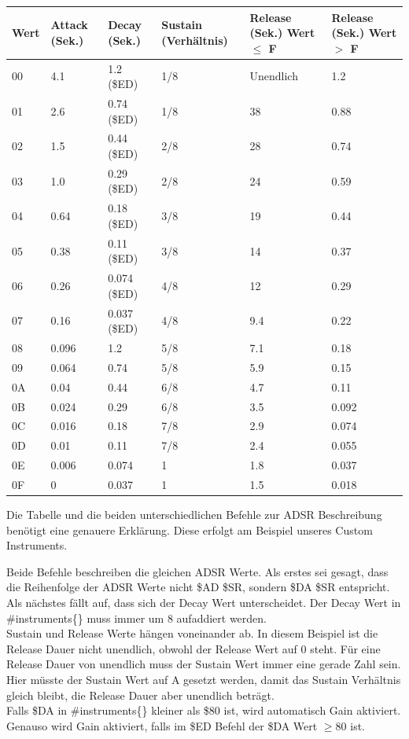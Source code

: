\begin{tabularx}{\textwidth}{|l|X|X|X|X|X|}
	\hline
	Wert & Attack (Sek.) & Decay (Sek.)  & Sustain (Verhältnis) & Release (Sek.) Wert $\leq$ F & Release (Sek.) Wert $>$ F \\
	\hline
	00 & 4.1 & 1.2 (\$ED) & 1/8 & Unendlich & 1.2\\
	\hline
	01 & 2.6 & 0.74 (\$ED) & 1/8 & 38 & 0.88 \\
	\hline
	02 & 1.5 & 0.44 (\$ED) & 2/8 & 28 & 0.74 \\
	\hline
	03 & 1.0 & 0.29 (\$ED) & 2/8 & 24 & 0.59 \\
	\hline
	04 & 0.64 & 0.18 (\$ED) & 3/8 & 19 & 0.44 \\
	\hline
	05 & 0.38 & 0.11 (\$ED) & 3/8 & 14 & 0.37 \\
	\hline
	06 & 0.26 & 0.074 (\$ED) & 4/8 & 12 & 0.29 \\
	\hline
	07 & 0.16 & 0.037 (\$ED) & 4/8 & 9.4 & 0.22 \\
	\hline
	08 & 0.096 & 1.2 & 5/8 & 7.1 & 0.18 \\
	\hline
	09 & 0.064 & 0.74 & 5/8 & 5.9 & 0.15 \\
	\hline
	0A & 0.04 & 0.44 & 6/8 & 4.7 & 0.11 \\
	\hline
	0B & 0.024 & 0.29 & 6/8 & 3.5 & 0.092 \\
	\hline
	0C & 0.016 & 0.18 & 7/8 & 2.9 & 0.074 \\
	\hline
	0D & 0.01 & 0.11 & 7/8 & 2.4 & 0.055 \\
	\hline
	0E & 0.006 & 0.074 & 1 & 1.8 & 0.037 \\
	\hline
	0F & 0 & 0.037 & 1 & 1.5 & 0.018 \\
	\hline
\end{tabularx}

\bigskip

Die Tabelle und die beiden unterschiedlichen Befehle zur ADSR Beschreibung benötigt eine genauere Erklärung. Diese erfolgt am Beispiel unseres Custom Instruments.


\medskip



\medskip

Beide Befehle beschreiben die gleichen ADSR Werte. Als erstes sei gesagt, dass die Reihenfolge der ADSR Werte nicht \$AD \$SR, sondern \$DA \$SR entspricht. \\
Als nächstes fällt auf, dass sich der Decay Wert unterscheidet. Der Decay Wert in \#instruments\{\} muss immer um 8 aufaddiert werden. \\
Sustain und Release Werte hängen voneinander ab. In diesem Beispiel ist die Release Dauer nicht unendlich, obwohl der Release Wert auf 0 steht. Für eine Release Dauer von unendlich muss der Sustain Wert immer eine gerade Zahl sein. Hier müsste der Sustain Wert auf A gesetzt werden, damit das Sustain Verhältnis gleich bleibt, die Release Dauer aber unendlich beträgt. \\
Falls \$DA in \#instruments\{\} kleiner als \$80 ist, wird automatisch Gain aktiviert. Genauso wird Gain aktiviert, falls im \$ED Befehl der \$DA Wert $\geq 80$ ist.

